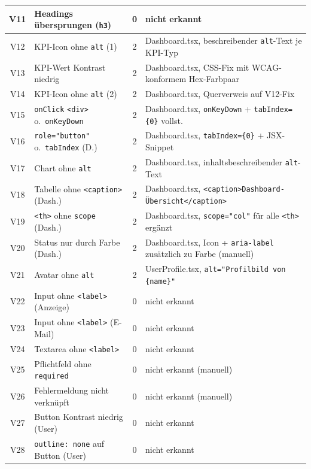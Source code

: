\begin{longtable}{|c|p{5.0cm}|c|p{5.4cm}|}
V11  & Headings übersprungen (\texttt{h3})          & 0 & nicht erkannt \\ \hline
V12  & KPI-Icon ohne \texttt{alt} (1)               & 2 & Dashboard.tsx, beschreibender \texttt{alt}-Text je KPI-Typ \\ \hline
V13  & KPI-Wert Kontrast niedrig                    & 2 & Dashboard.tsx, CSS-Fix mit WCAG-konformem Hex-Farbpaar \\ \hline
V14  & KPI-Icon ohne \texttt{alt} (2)               & 2 & Dashboard.tsx, Querverweis auf V12-Fix \\ \hline
V15  & \texttt{onClick} \texttt{<div>} o.\ \texttt{onKeyDown} & 2 & Dashboard.tsx, \texttt{onKeyDown} + \texttt{tabIndex=\{0\}} vollst. \\ \hline
V16  & \texttt{role="button"} o.\ \texttt{tabIndex} (D.) & 2 & Dashboard.tsx, \texttt{tabIndex=\{0\}} + JSX-Snippet \\ \hline
V17  & Chart ohne \texttt{alt}                      & 2 & Dashboard.tsx, inhaltsbeschreibender \texttt{alt}-Text \\ \hline
V18  & Tabelle ohne \texttt{<caption>} (Dash.)      & 2 & Dashboard.tsx, \texttt{<caption>Dashboard-Übersicht</caption>} \\ \hline
V19  & \texttt{<th>} ohne \texttt{scope} (Dash.)    & 2 & Dashboard.tsx, \texttt{scope="col"} für alle \texttt{<th>} ergänzt \\ \hline
V20  & Status nur durch Farbe (Dash.)               & 2 & Dashboard.tsx, Icon + \texttt{aria-label} zusätzlich zu Farbe (manuell) \\ \hline
V21  & Avatar ohne \texttt{alt}                     & 2 & UserProfile.tsx, \texttt{alt="Profilbild von \{name\}"} \\ \hline
V22  & Input ohne \texttt{<label>} (Anzeige)        & 0 & nicht erkannt \\ \hline
V23  & Input ohne \texttt{<label>} (E-Mail)         & 0 & nicht erkannt \\ \hline
V24  & Textarea ohne \texttt{<label>}               & 0 & nicht erkannt \\ \hline
V25  & Pflichtfeld ohne \texttt{required}           & 0 & nicht erkannt (manuell) \\ \hline
V26  & Fehlermeldung nicht verknüpft                & 0 & nicht erkannt (manuell) \\ \hline
V27  & Button Kontrast niedrig (User)               & 0 & nicht erkannt \\ \hline
V28  & \texttt{outline: none} auf Button (User)     & 0 & nicht erkannt \\ \hline

\end{longtable}
